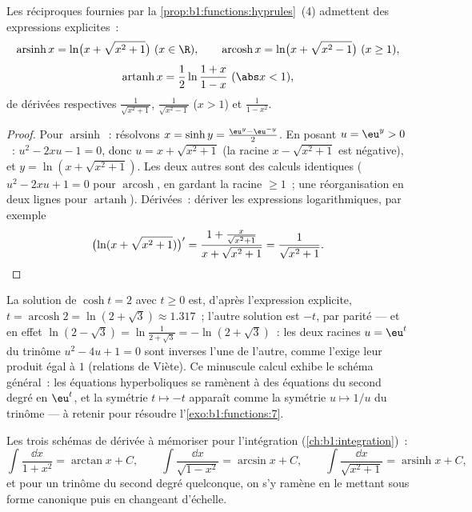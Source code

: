 \begin{proposition}\label{prop:b1:functions:invhyp}
Les réciproques fournies par la
\cref{prop:b1:functions:hyprules}~(4) admettent des expressions
explicites~:
\[
\operatorname{arsinh} x = \ln\bigl(x + \sqrt{x^2 + 1}\bigr)
\ (x \in \R),
\qquad
\operatorname{arcosh} x = \ln\bigl(x + \sqrt{x^2 - 1}\bigr)
\ (x \geq 1),
\]
\[
\operatorname{artanh} x = \frac 12 \ln\frac{1 + x}{1 - x}
\ (\abs x < 1),
\]
de dérivées respectives $\frac{1}{\sqrt{x^2+1}}$,
$\frac{1}{\sqrt{x^2-1}}$ ($x > 1$) et $\frac{1}{1 - x^2}$.
\end{proposition}

\begin{proof}
Pour $\operatorname{arsinh}$~: résolvons $x = \sinh y = \frac{\eu^y -
\eu^{-y}}{2}$. En posant $u = \eu^y > 0$~: $u^2 - 2xu - 1 = 0$, donc
$u = x + \sqrt{x^2 + 1}$ (la racine $x - \sqrt{x^2+1}$ est négative),
et $y = \ln(x + \sqrt{x^2+1})$. Les deux autres sont des calculs
identiques ($u^2 - 2xu + 1 = 0$ pour $\operatorname{arcosh}$, en
gardant la racine $\geq 1$~; une réorganisation en deux lignes pour
$\operatorname{artanh}$). Dérivées~: dériver les expressions
logarithmiques, par exemple
\[
\bigl(\ln(x + \sqrt{x^2+1})\bigr)'
= \frac{1 + \frac{x}{\sqrt{x^2+1}}}{x + \sqrt{x^2+1}}
= \frac{1}{\sqrt{x^2 + 1}} . \qedhere
\]
\end{proof}

\begin{example}\label{ex:b1:functions:arcoshtwo}
La solution de $\cosh t = 2$ avec $t \geq 0$ est, d'après
l'expression explicite, $t = \operatorname{arcosh} 2 = \ln(2 +
\sqrt3) \approx 1.317$~; l'autre solution est $-t$, par parité --- et
en effet $\ln(2 - \sqrt3) = \ln\frac1{2 + \sqrt3} = -\ln(2 +
\sqrt3)$~: les deux racines $u = \eu^t$ du trinôme $u^2 - 4u + 1 = 0$
sont inverses l'une de l'autre, comme l'exige leur produit égal à $1$
(relations de Viète). Ce minuscule calcul exhibe le schéma général~:
les équations hyperboliques se ramènent à des équations du second
degré en $\eu^t$, et la symétrie $t \mapsto -t$ apparaît comme la
symétrie $u \mapsto 1/u$ du trinôme --- à retenir pour résoudre
l'\cref{exo:b1:functions:7}.
\end{example}

\begin{method}\label{met:b1:functions:primitive}
Les trois schémas de dérivée à mémoriser pour l'intégration
(\cref{ch:b1:integration})~:
\[
\int \frac{\dd x}{1 + x^2} = \arctan x + C,
\qquad
\int \frac{\dd x}{\sqrt{1 - x^2}} = \arcsin x + C,
\qquad
\int \frac{\dd x}{\sqrt{x^2 + 1}} = \operatorname{arsinh} x + C,
\]
et pour un trinôme du second degré quelconque, on s'y ramène en le
mettant sous forme canonique puis en changeant d'échelle.
\end{method}

